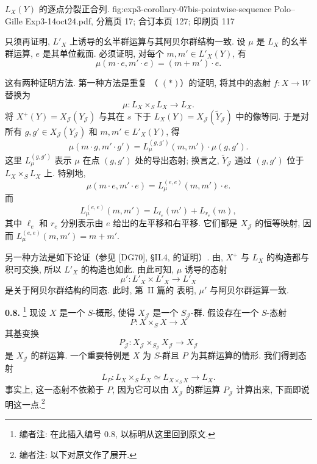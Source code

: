   {\(L_X(Y)\) 的逐点分裂正合列.}
  {fig:exp3-corollary-07bis-pointwise-sequence}
  {Polo--Gille Exp3-14oct24.pdf, 分篇页 17; 合订本页 127; 印刷页 117}

只须再证明, \(L'_X\) 上诱导的幺半群运算与其阿贝尔群结构一致.
设 \(\mu\) 是 \(L_X\) 的幺半群运算, \(e\) 是其单位截面.
必须证明, 对每个 \(m,m'\in L'_X(Y)\), 有
\[
 \mu(m\mathbin{\cdot}e,m'\mathbin{\cdot}e)
   =(m+m')\mathbin{\cdot}e.
\]

这有两种证明方法. 第一种方法是重复
（ \((\ast)\)）的证明,
将其中的态射 \(f:X\to W\) 替换为
\[
 \mu:L_X\times_S L_X\longrightarrow L_X.
\]
将 \(X^+(Y)=X_{\mathscr J}(Y_{\mathscr J})\) 与其在 \(s\) 下于
\(L_X(Y)=X_{\mathscr J}(\widetilde Y_{\mathscr J})\) 中的像等同.
于是对所有 \(g,g'\in X_{\mathscr J}(Y_{\mathscr J})\) 和
\(m,m'\in L'_X(Y)\), 得
\begin{equation}
 \mu(m\mathbin{\cdot}g,m'\mathbin{\cdot}g')
 =L_\mu^{(g,g')}(m,m')\mathbin{\cdot}\mu(g,g').
 \tag{$\star$}\label{sga3:iii:corollary:0-7-bis:equation:star}
\end{equation}
这里 \(L_\mu^{(g,g')}\) 表示 \(\mu\) 在点 \((g,g')\) 处的导出态射;
换言之, \(\widetilde Y_{\mathscr J}\) 通过 \((g,g')\)
位于 \(L_X\times_S L_X\) 上. 特别地,
\[
 \mu(m\mathbin{\cdot}e,m'\mathbin{\cdot}e)
 =L_\mu^{(e,e)}(m,m')\mathbin{\cdot}e.
\]
而
\[
 L_\mu^{(e,e)}(m,m')=L_{\ell_e}(m')+L_{r_e}(m),
\]
其中 \(\ell_e\) 和 \(r_e\) 分别表示由 \(e\) 给出的左平移和右平移.
它们都是 \(X_{\mathscr J}\) 的恒等映射, 因而
\(L_\mu^{(e,e)}(m,m')=m+m'\).

另一种方法是如下论证（参见 [DG70], \S II.4,
 的证明）.
由,
\(X^+\) 与 \(L_X\) 的构造都与积可交换, 所以 \(L'_X\) 的构造也如此.
由此可知, \(\mu\) 诱导的态射
\[
 \mu':L'_X\times L'_X\longrightarrow L'_X
\]
是关于阿贝尔群结构的同态. 此时, 第~II 篇的
 表明,
\(\mu'\) 与阿贝尔群运算一致.

\medskip
\noindent{}\textbf{0.8.}
\footnote{编者注: 在此插入编号 0.8, 以标明从这里回到原文.}
现设 \(X\) 是一个 \(S\)-概形, 使得 \(X_{\mathscr J}\) 是一个
\(S_{\mathscr J}\)-群. 假设存在一个 \(S\)-态射
\[
 P:X\times_S X\longrightarrow X
\]
其基变换
\[
 P_{\mathscr J}:
 X_{\mathscr J}\times_{S_{\mathscr J}}X_{\mathscr J}
 \longrightarrow X_{\mathscr J}
\]
是 \(X_{\mathscr J}\) 的群运算. 一个重要特例是 \(X\) 为
\(S\)-群且 \(P\) 为其群运算的情形. 我们得到态射
\[
 L_P:L_X\times_S L_X\simeq L_{X\times_S X}\longrightarrow L_X.
\]
事实上, 这一态射不依赖于 \(P\), 因为它可以由
\(X_{\mathscr J}\) 的群运算 \(P_{\mathscr J}\) 计算出来,
下面即说明这一点.\footnote{编者注: 以下对原文作了展开.}

